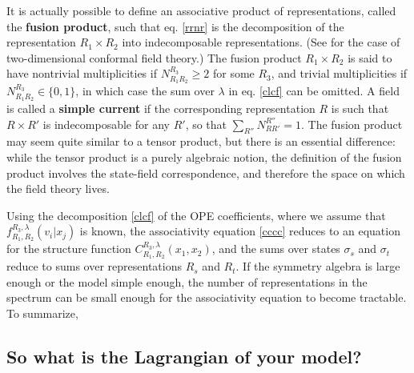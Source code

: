 \documentclass[12pt,a4paper,notitlepage]{report}
\numberwithin{equation}{section}
\theoremstyle{break}
\begin{document}
It is actually possible to define an associative product of representations, called the \textbf{\boldmath fusion product}, such that eq. \eqref{rrnr} is the decomposition of the representation $R_1\times R_2$ into indecomposable representations. (See \cite{gab99} for the case of two-dimensional conformal field theory.) 
The fusion product $R_1\times R_2$ is said to have nontrivial multiplicities if $N_{R_1R_2}^{R_3}\geq 2$ for some $R_3$, and trivial multiplicities if $N_{R_1R_2}^{R_3}\in \{0,1\}$, in which case the sum over $\lambda$ in eq. \eqref{clcf} can be omitted.
A field is called a \textbf{\boldmath simple current} if the corresponding representation $R$ is such that $R\times R'$ is indecomposable for any $R'$, so that $\sum_{R''} N_{RR'}^{R''} =1$. 
The fusion product may seem quite similar to a tensor product, but there is an essential difference: while the tensor product is a purely algebraic notion, the definition of the fusion product involves the state-field correspondence, and therefore the space on which the field theory lives. 

Using the decomposition \eqref{clcf} of the OPE coefficients, where we assume that $f_{R_1,R_2}^{R_3,\lambda}(v_i|x_j)$ is known, the 
associativity equation \eqref{cccc} reduces to an equation for the structure function $C_{R_1,R_2}^{R_3,\lambda}(x_1,x_2)$, and the sums over states $\sigma_s$ and $\sigma_t$ reduce to sums over representations $R_s$ and $R_t$.
If the symmetry algebra is large enough or the model simple enough, the number of representations in the spectrum can be small enough for the associativity equation to become tractable.
To summarize,
\begin{center}
\end{center}


\subsection{So what is the Lagrangian of your model? \label{seclagr}}
\end{document}
